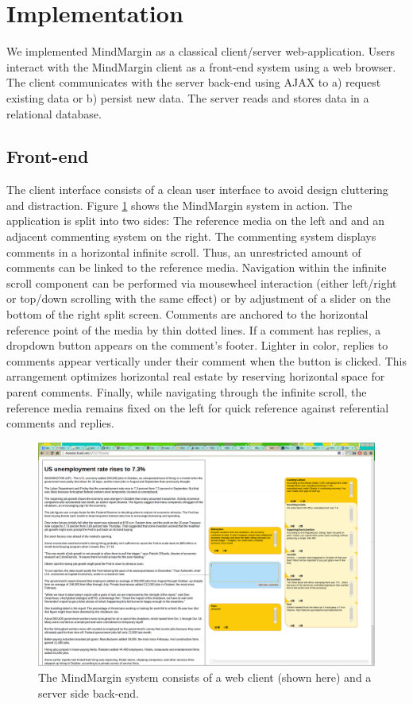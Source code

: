 \section {Implementation}

We implemented MindMargin as a classical client/server web-application. Users interact with the MindMargin client as a front-end system using a web browser. The client communicates with the server back-end using AJAX to a) request existing data or b) persist new data. The server reads and stores data in a relational database.

\subsection{Front-end}
The client interface consists of a clean user interface to avoid design cluttering and distraction. Figure \ref{fig:frontend} shows the MindMargin system in action. The application is split into two sides: The reference media on the left and and an adjacent commenting system on the right. The commenting system displays comments in a horizontal infinite scroll. Thus, an unrestricted amount of comments can be linked to the reference media. Navigation within the infinite scroll component can be performed via mousewheel interaction (either left/right or top/down scrolling with the same effect) or by adjustment of a slider on the bottom of the right split screen. Comments are anchored to the horizontal reference point of the media by thin dotted lines. If a comment has replies, a dropdown button appears on the comment's footer. Lighter in color, replies to comments appear vertically under their comment when the button is clicked. This arrangement optimizes horizontal real estate by reserving horizontal space for parent comments. Finally, while navigating through the infinite scroll, the reference media remains fixed on the left for quick reference against referential comments and replies.

\begin{figure}
\includegraphics[scale=0.13]{mindmargin.png} 
\caption{The MindMargin system consists of a web client (shown here) and a server side back-end.}
\label{fig:frontend}
\end{figure}


